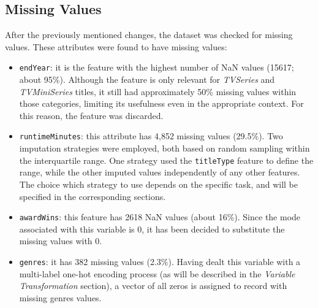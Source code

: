 \subsection{Missing Values}
After the previously mentioned changes, the dataset was checked for missing values.
These attributes were found to have missing values:
\begin{itemize}
    \item \texttt{endYear}: it is the feature with the highest number of NaN values (15617; about 95\%).
    Although the feature is only relevant for \textit{TVSeries} and \textit{TVMiniSeries} titles, it still
    had approximately 50\% missing values within those categories, limiting its usefulness even in the
    appropriate context. For this reason, the feature was discarded.
    
    \item \texttt{runtimeMinutes}: this attribute has 4,852 missing values (29.5\%). Two imputation strategies were employed, both based on random sampling within the interquartile range. One strategy used the \texttt{titleType} feature to define the range, while the other imputed values independently of any other features. The choice which strategy to use depends on the specific task, and will be specified in the corresponding sections.\\

    
    \item \texttt{awardWins}: this feature has 2618 NaN values (about 16\%).
    Since the mode associated with this variable is 0, it has been decided to substitute the missing
    values with 0.

    \item \texttt{genres}: it has 382 missing values (2.3\%). Having dealt this variable with a
    multi-label one-hot encoding process (as will be described in the \textit{Variable Transformation}
    section), a vector of all zeros is assigned to record with missing genres values.
\end{itemize}



